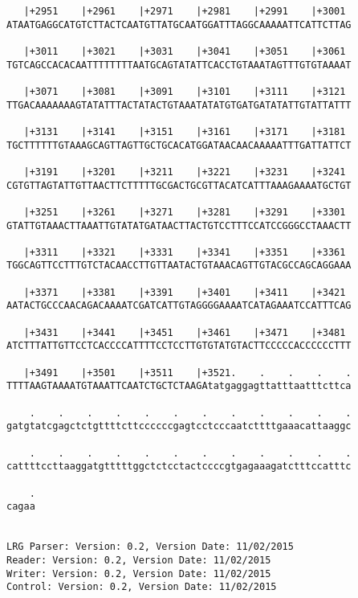\documentclass{article}
\begin{document}
\begin{Verbatim}
   |+2951    |+2961    |+2971    |+2981    |+2991    |+3001 
ATAATGAGGCATGTCTTACTCAATGTTATGCAATGGATTTAGGCAAAAATTCATTCTTAG
                                                            
   |+3011    |+3021    |+3031    |+3041    |+3051    |+3061 
TGTCAGCCACACAATTTTTTTTAATGCAGTATATTCACCTGTAAATAGTTTGTGTAAAAT
                                                            
   |+3071    |+3081    |+3091    |+3101    |+3111    |+3121 
TTGACAAAAAAAGTATATTTACTATACTGTAAATATATGTGATGATATATTGTATTATTT
                                                            
   |+3131    |+3141    |+3151    |+3161    |+3171    |+3181 
TGCTTTTTTGTAAAGCAGTTAGTTGCTGCACATGGATAACAACAAAAATTTGATTATTCT
                                                            
   |+3191    |+3201    |+3211    |+3221    |+3231    |+3241 
CGTGTTAGTATTGTTAACTTCTTTTTGCGACTGCGTTACATCATTTAAAGAAAATGCTGT
                                                            
   |+3251    |+3261    |+3271    |+3281    |+3291    |+3301 
GTATTGTAAACTTAAATTGTATATGATAACTTACTGTCCTTTCCATCCGGGCCTAAACTT
                                                            
   |+3311    |+3321    |+3331    |+3341    |+3351    |+3361 
TGGCAGTTCCTTTGTCTACAACCTTGTTAATACTGTAAACAGTTGTACGCCAGCAGGAAA
                                                            
   |+3371    |+3381    |+3391    |+3401    |+3411    |+3421 
AATACTGCCCAACAGACAAAATCGATCATTGTAGGGGAAAATCATAGAAATCCATTTCAG
                                                            
   |+3431    |+3441    |+3451    |+3461    |+3471    |+3481 
ATCTTTATTGTTCCTCACCCCATTTTCCTCCTTGTGTATGTACTTCCCCCACCCCCCTTT
                                                            
   |+3491    |+3501    |+3511    |+3521.    .    .    .    .
TTTTAAGTAAAATGTAAATTCAATCTGCTCTAAGAtatgaggagttatttaatttcttca
                                                            
    .    .    .    .    .    .    .    .    .    .    .    .
gatgtatcgagctctgttttcttccccccgagtcctcccaatcttttgaaacattaaggc
                                                            
    .    .    .    .    .    .    .    .    .    .    .    .
cattttccttaaggatgtttttggctctcctactccccgtgagaaagatctttccatttc
                                                            
    .
cagaa
     
     
LRG Parser: Version: 0.2, Version Date: 11/02/2015
Reader: Version: 0.2, Version Date: 11/02/2015
Writer: Version: 0.2, Version Date: 11/02/2015
Control: Version: 0.2, Version Date: 11/02/2015
\end{Verbatim}
\end{document}
